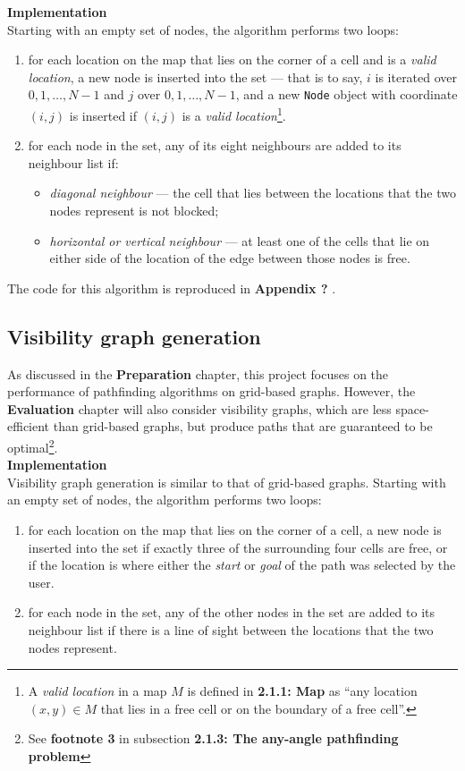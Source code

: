 \documentclass[12pt,notitlepage]{report}
\begin{document}
\noindent
{\bfseries Implementation}\\
\noindent
Starting with an empty set of nodes, the algorithm performs two loops:
\begin{enumerate}
\item for each location on the map that lies on the corner of a cell and is a {\em valid location}, a new node is inserted into the set  --- that is to say, $i$ is iterated over $0,1,\ldots,N-1$ and $j$ over $0,1,\ldots,N-1$, and a new {\tt Node} object with coordinate $(i,j)$ is inserted if $(i,j)$ is a {\em valid location}\footnote{A {\em valid location} in a map $M$ is defined in {\bfseries 2.1.1: Map} as ``any location $(x,y) \in M$ that lies in a free cell or on the boundary of a free cell''.}.
\item for each node in the set, any of its eight neighbours are added to its neighbour list if:
  \begin{itemize}
  \item {\em diagonal neighbour} --- the cell that lies between the locations that the two nodes represent is not blocked;
  \item {\em horizontal or vertical neighbour} --- at least one of the cells that lie on either side of the location of the edge between those nodes is free.
  \end{itemize}
\end{enumerate}
The code for this algorithm is reproduced in {\bfseries Appendix ?} .

\subsection{Visibility graph generation}
As discussed in the {\bfseries Preparation} chapter, this project focuses on the performance of pathfinding algorithms on grid-based graphs. However, the {\bfseries Evaluation} chapter will also consider visibility graphs, which are less space-efficient than grid-based graphs, but produce paths that are guaranteed to be optimal\footnote{See {\bfseries footnote 3} in subsection {\bfseries 2.1.3: The any-angle pathfinding problem}}.\\

\noindent
{\bfseries Implementation}\\
\noindent
Visibility graph generation is similar to that of grid-based graphs. Starting with an empty set of nodes, the algorithm performs two loops:
\begin{enumerate}
\item for each location on the map that lies on the corner of a cell, a new node is inserted into the set if exactly three of the surrounding four cells are free, or if the location is where either the {\em start} or {\em goal} of the path was selected by the user.
\item for each node in the set, any of the other nodes in the set are added to its neighbour list if there is a line of sight between the locations that the two nodes represent.
\end{enumerate}
\end{document}
